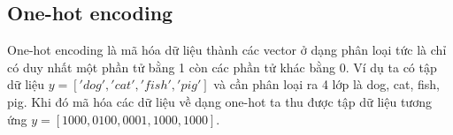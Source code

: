 %
%
%
%
%
%
\subsection{One-hot encoding}
One-hot encoding là mã hóa dữ liệu thành các vector ở dạng phân loại tức là chỉ có duy nhất một phần tử bằng 1 còn các phần tử khác bằng 0. Ví dụ ta có tập dữ liệu $y=['dog','cat','fish','pig']$ và cần phân loại ra 4 lớp là dog, cat, fish, pig. Khi đó mã hóa các dữ liệu về dạng one-hot ta thu được tập dữ liệu tương ứng $y=[1000,0100,0001,1000,1000]$.


